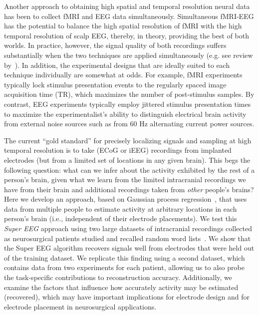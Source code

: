 Another approach to obtaining high spatial and temporal resolution
neural data has been to collect fMRI and EEG data simultaneously.
Simultaneous fMRI-EEG has the potential to balance the high spatial
resolution of fMRI with the high temporal resolution of scalp EEG,
thereby, in theory, providing the best of both worlds.  In practice,
however, the signal quality of both recordings suffers substantially
when the two techniques are applied simultaneously (e.g. see review
by~\cite{HustEtal12}).  In addition, the experimental designs that are
ideally suited to each technique individually are somewhat at odds.
For example, fMRI experiments typically lock stimulus presentation
events to the regularly spaced image acquisition time (TR), which
maximizes the number of post-stimulus samples.  By contrast, EEG
experiments typically employ jittered stimulus presentation times to
maximize the experimentalist's ability to distinguish electrical brain
activity from external noise sources such as from 60 Hz alternating
current power sources.

The current ``gold standard'' for precisely localizing signals and
sampling at high temporal resolution is to take (ECoG or iEEG)
recordings from implanted electrodes (but from a limited set of
locations in any given brain).  This begs the following question: what
can we infer about the activity exhibited by the rest of a person's
brain, given what we learn from the limited intracranial recordings we
have from their brain and additional recordings taken from
\textit{other} people's brains?  Here we develop an approach, based on
Gaussian process regression~\cite{Rasm06}, that uses data from
multiple people to estimate activity at arbitrary
locations in each person's brain (i.e., independent of their electrode
placements).  We test this \textit{Super EEG} approach using two large
datasets of intracranial recordings collected as neurosurgical patients
studied and recalled random word lists~\cite{SedeEtal03, SedeEtal07a,
  SedeEtal07b, MannEtal11, MannEtal12}.  We show that the Super EEG
algorithm recovers signals well from electrodes that were held out of
the training dataset.  We replicate this finding using a second dataset, which contains data from two experiments for each patient, allowing us to also probe the task-specific contributions to reconstruction accuracy.  Additionally, we examine the factors that influence how
accurately activity may be estimated (recovered), which may have important
implications for electrode design and for electrode placement in
neurosurgical applications.

